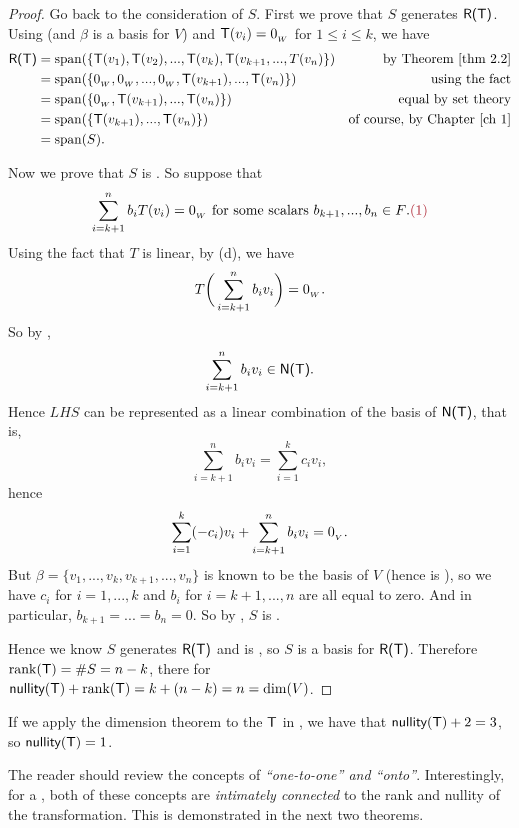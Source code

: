 \begin{proof}
Go back to the consideration of \(S\).
First we prove that \(S\) generates \(\textsf{R(T)}\).
Using  (and \(\beta\) is a basis for \(V\)) and  \(\textsf{T}(v_i) = 0_{_W}\) for \(1 \le i \le k\), we have
\begin{align*}
    \RANGET & = \spann(\{ \T(v_1), \T(v_2), ..., \T(v_{k}), \T(v_{k + 1}, ..., T(v_n) \}) & \text{by \THM{2.2}} \\
            & = \spann(\{ \OW, \OW, ..., \OW, \T(v_{k + 1}), ..., \T(v_{n}) \}) & \text{using the fact} \\
            & = \spann(\{ \OW, \T(v_{k + 1}), ..., \T(v_{n}) \}) & \text{equal by set theory} \\
            & = \spann(\{ \T(v_{k + 1}), ..., \T(v_{n}) \}) & \text{of course, by \CH{1}} \\
            & = \spann(S).
\end{align*}

Now we prove that \(S\) is \LID{}.
So suppose that
\[
    \sum_{i = k + 1}^n b_i T(v_i) = \OW \text{ for some scalars \(b_{k + 1}, ..., b_n \in F\)}. \MAROON{(1)}
\]
Using the fact that \(T\) is linear, by (d), we have
\[
    T\bigg( \sum_{i = k + 1}^n b_i v_i \bigg) = 0_{_W}.
\]
So by ,
\[
    \sum_{i = k + 1}^n b_i v_i \in \textsf{N(T)}.
\]
Hence \(LHS\) can be represented as a linear combination of the basis of \(\textsf{N(T)}\), that is,
\[
    \sum_{i = k + 1}^n b_i v_i = \sum_{i = 1}^k c_i v_i,
\]
hence
\[
    \sum_{i = 1}^k (-c_i) v_i + \sum_{i = k + 1}^n b_i v_i = 0_{_V}.
\]
But \(\beta = \{ v_1, ..., v_k, v_{k + 1}, ..., v_n \}\) is known to be the basis of \(V\) (hence is \LID{}), so we have \(c_i\) for \(i = 1, ..., k\) and \(b_i\) for \(i = k + 1, ..., n\) are all equal to zero.
And in particular, \(b_{k + 1} = ... = b_n = 0\).
So by , \(S\) is \LID{}.

Hence we know \(S\) generates \(\textsf{R(T)}\) and is \LID{}, so \(S\) is a basis for \(\textsf{R(T)}\).
Therefore \(\mathrm{rank}(\textsf{T}) = \#S = n - k\), there for \(\textsf{nullity}(\textsf{T}) + \mathrm{rank}(\textsf{T}) = k + (n - k) = n = \dim(V)\).
\end{proof}

\begin{note}
If we apply the dimension theorem to the \LTRAN{} \(\textsf{T}\) in , we have that \(\textsf{nullity}(\textsf{T}) + 2 = 3\), so \(\textsf{nullity}(\textsf{T}) = 1\).
\end{note}

\begin{remark} \label{remark 2.1.8}
The reader should review the concepts of \emph{``one-to-one'' and ``onto''}.
Interestingly, for a \LTRAN{}, both of these concepts are \emph{intimately connected} to the rank and nullity of the transformation.
This is demonstrated in the next two theorems.
\end{remark}

